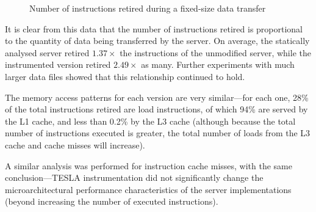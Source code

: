 \begin{figure}[ht]
  \centering
  \caption{Number of instructions retired during a fixed-size data
  transfer}
  \label{fig:retired-bench}
\end{figure}

It is clear from this data that the number of instructions retired is
proportional to the quantity of data being transferred by the server. On
average, the statically analysed server retired $1.37\times$ the
instructions of the unmodified server, while the instrumented version
retired $2.49\times$ as many. Further experiments with much larger data
files showed that this relationship continued to hold.

The memory access patterns for each version are very similar---for each
one, 28\% of the total instructions retired are load instructions, of
which 94\% are served by the L1 cache, and less than 0.2\% by the L3
cache (although because the total number of instructions executed is
greater, the total number of loads from the L3 cache and cache misses
will increase).

A similar analysis was performed for instruction cache misses, with the
same conclusion---TESLA instrumentation did not significantly change the
microarchitectural performance characteristics of the server
implementations (beyond increasing the number of executed instructions).

